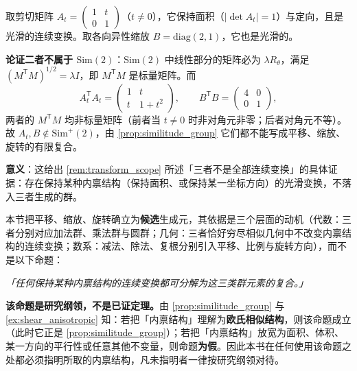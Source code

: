 \begin{example}[反例：剪切变换与各向异性缩放不属于相似群]\label{ex:shear_anisotropic}
取剪切矩阵 $A_t = \left(\begin{smallmatrix}1 & t\\ 0 & 1\end{smallmatrix}\right)$（$t\ne0$），它保持面积（$|\det A_t|=1$）与定向，且是光滑的连续变换。取各向异性缩放 $B=\mathrm{diag}(2,1)$，它也是光滑的。

\textbf{论证二者不属于 $\mathrm{Sim}(2)$}：$\mathrm{Sim}(2)$ 中线性部分的矩阵必为 $\lambda R_\theta$，满足 $(M^{\mathsf T}M)^{1/2}=\lambda I$，即 $M^{\mathsf T}M$ 是标量矩阵。而
\[
A_t^{\mathsf T}A_t=\begin{pmatrix}1&t\\ t&1+t^2\end{pmatrix},\qquad
B^{\mathsf T}B=\begin{pmatrix}4&0\\0&1\end{pmatrix},
\]
两者的 $M^{\mathsf T}M$ 均非标量矩阵（前者当 $t\ne0$ 时非对角元非零；后者对角元不等）。故 $A_t,B\notin\mathrm{Sim}^{+}(2)$，由 \cref{prop:similitude_group} 它们都不能写成平移、缩放、旋转的有限复合。

\textbf{意义}：这给出 \cref{rem:transform_scope} 所述「三者不是全部连续变换」的具体证据：存在保持某种内禀结构（保持面积、或保持某一坐标方向）的光滑变换，不落入三者生成的群。
\end{example}

\begin{remark}[三类变换的适用边界]\label{rem:transform_scope}
本节把平移、缩放、旋转确立为\textbf{候选}生成元，其依据是三个层面的动机（代数：三者分别对应加法群、乘法群与圆群；几何：三者恰好穷尽相似几何中不改变内禀结构的连续变换；数系：减法、除法、复根分别引入平移、比例与旋转方向），而不是以下命题：

\begin{center}
\textit{「任何保持某种内禀结构的连续变换都可分解为这三类群元素的复合。」}
\end{center}

\textbf{该命题是研究纲领，不是已证定理。}由 \cref{prop:similitude_group} 与 \cref{ex:shear_anisotropic} 知：若把「内禀结构」理解为\textbf{欧氏相似结构}，则该命题成立（此时它正是 \cref{prop:similitude_group}）；若把「内禀结构」放宽为面积、体积、某一方向的平行性或任意其他不变量，则命题\textbf{为假}。因此本书在任何使用该命题之处都必须指明所取的内禀结构，凡未指明者一律按研究纲领对待。
\end{remark}

